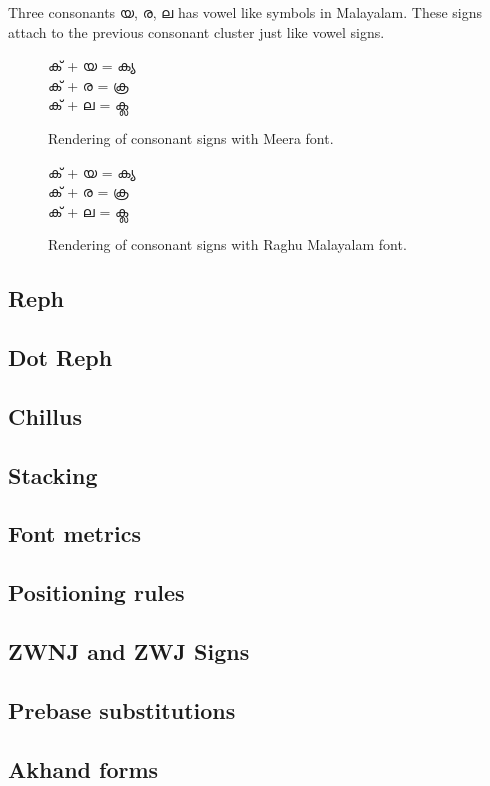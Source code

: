 Three consonants {\malayalam യ, ര, ല} has vowel like symbols in Malayalam.
These signs attach to the previous consonant cluster just like vowel signs.

\begin{figure}[h!]
  \centering
  {\meera\textexample ക് + യ = ക്യ \\ ക് + ര = ക്ര \\ ക് + ല = ക്ല }\\
  \caption{Rendering of consonant signs with Meera font.}
\end{figure}

\begin{figure}[h!]
  \centering
  {\raghumalayalam\textexample ക് + യ = ക്യ \\ ക് + ര = ക്ര \\ ക് + ല = ക്ല }\\
  \caption{Rendering of consonant signs with Raghu Malayalam font.}
\end{figure}

\subsection {Reph}
\subsection {Dot Reph}
\subsection {Chillus}
\subsection {Stacking}
\subsection {Font metrics} 
\subsection {Positioning rules} 
\subsection {ZWNJ and ZWJ Signs}
\subsection {Prebase substitutions}
\subsection {Akhand forms}
